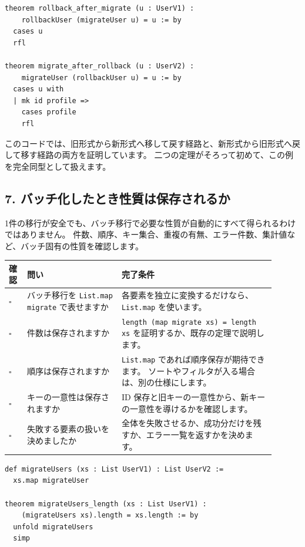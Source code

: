 \begin{listing}[htbp]
\begin{verbatim}
theorem rollback_after_migrate (u : UserV1) :
    rollbackUser (migrateUser u) = u := by
  cases u
  rfl

theorem migrate_after_rollback (u : UserV2) :
    migrateUser (rollbackUser u) = u := by
  cases u with
  | mk id profile =>
    cases profile
    rfl
\end{verbatim}
\caption{\texttt{rollback\_after\_migrate}・\texttt{migrate\_after\_rollback}}
\label{lst:appD_roundtrip}
\end{listing}

このコードでは、旧形式から新形式へ移して戻す経路と、新形式から旧形式へ戻して移す経路の両方を証明しています。
二つの定理がそろって初めて、この例を完全同型として扱えます。

\subsection{7. バッチ化したとき性質は保存されるか}

1件の移行が安全でも、バッチ移行で必要な性質が自動的にすべて得られるわけではありません。
件数、順序、キー集合、重複の有無、エラー件数、集計値など、バッチ固有の性質を確認します。

\begin{longtable}{@{}p{0.06\linewidth}p{0.32\linewidth}p{0.52\linewidth}@{}}
\toprule
確認 & 問い & 完了条件 \\
\midrule
\endhead
\(\square\) & バッチ移行を \texttt{List.map migrate} で表せますか & 各要素を独立に変換するだけなら、\texttt{List.map} を使います。 \\
\(\square\) & 件数は保存されますか & \texttt{length (map migrate xs) = length xs} を証明するか、既存の定理で説明します。 \\
\(\square\) & 順序は保存されますか & \texttt{List.map} であれば順序保存が期待できます。
ソートやフィルタが入る場合は、別の仕様にします。 \\
\(\square\) & キーの一意性は保存されますか & ID 保存と旧キーの一意性から、新キーの一意性を導けるかを確認します。 \\
\(\square\) & 失敗する要素の扱いを決めましたか & 全体を失敗させるか、成功分だけを残すか、エラー一覧を返すかを決めます。 \\
\bottomrule
\end{longtable}

\begin{listing}[htbp]
\begin{verbatim}
def migrateUsers (xs : List UserV1) : List UserV2 :=
  xs.map migrateUser

theorem migrateUsers_length (xs : List UserV1) :
    (migrateUsers xs).length = xs.length := by
  unfold migrateUsers
  simp
\end{verbatim}
\caption{\texttt{migrateUsers}・\texttt{migrateUsers\_length}}
\label{lst:appD_batch_migration}
\end{listing}

